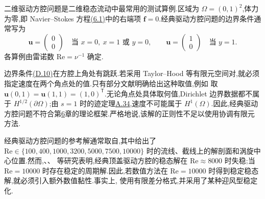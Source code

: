 \begin{example}[二维驱动方腔问题]\label{ex:appendix-d-4}
二维驱动方腔问题是二维稳态流动中最常用的测试算例.区域为 $\Omega=(0,1)^2$,体力为零,即 Navier--Stokes 方程\hyperref[eq:steady-ns-strong]{(6.1)}中的右端项 $\bm f=0$.经典驱动方腔问题的边界条件通常写为
\begin{equation}\label{eq:appendix-d-10}
\bm u=\begin{pmatrix}0\\0\end{pmatrix}
\quad\text{当 }x=0,\ x=1\text{ 或 }y=0,\qquad
\bm u=\begin{pmatrix}1\\0\end{pmatrix}
\quad\text{当 }y=1.
\end{equation}
各算例由雷诺数 $\mathrm{Re}=\nu^{-1}$ 确定.

边界条件\hyperref[eq:appendix-d-10]{(D.10)}在方腔上角处有跳跃.若采用 Taylor--Hood 等有限元空间对,就必须指定速度在两个角点处的值.只有部分文献明确给出这种取值,例如\textcite{Olshanskii2002} 取
$\bm u(0,1)=\bm u(1,1)=(1,0)^\mathsf T$.无论角点处具体取何值,Dirichlet 边界数据都不属于 $H^{1/2}(\partial\Omega)$;由 $s=1$ 时的迹定理\hyperref[thm:appendix-a-34]{A.34},速度不可能属于 $H^1(\Omega)$.因此,经典驱动方腔问题不符合第\hyperref[chap:steady-navier-stokes]{6}章的理论框架.严格地说,该解的正则性不足以使用协调有限元方法.

经典驱动方腔问题的参考解通常取自\textcite{Ghia1982},其中给出了
$\mathrm{Re}\in\{100,400,1000,3200,5000,7500,10000\}$ 时的流线、截线上的解剖面和涡旋中心位置.然而,\textcite{Cazemier1998}、\textcite{Tiesinga2002}、\textcite{BruneauSaad2006} 等研究表明,经典顶盖驱动方腔的稳态解在 $\mathrm{Re}\approx8000$ 时失稳;当 $\mathrm{Re}=10000$ 时存在稳定的周期解.因此,若数值方法在 $\mathrm{Re}=10000$ 时得到稳定稳态解,就必须引入额外数值黏性.事实上,\textcite{Ghia1982} 使用有限差分格式,并采用了某种迎风型稳定化.


\end{example}
